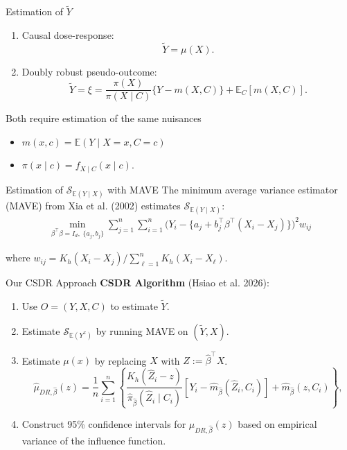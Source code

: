 \documentclass[
  ignorenonframetext,
  aspectratio=169,
  11pt]{beamer}
\providecommand{\tightlist}{%
  \setlength{\itemsep}{0pt}\setlength{\parskip}{0pt}}
\begin{document}
\begin{frame}{Estimation of \(\widetilde{Y}\)}
\protect{}\label{estimation-of-widetildey}
\begin{enumerate}
\tightlist
\item
  Causal dose-response: \[\widetilde{Y}=\mu(X).\]
\item
  Doubly robust pseudo-outcome: \[
  \widetilde{Y}=\xi=
  \frac{\pi(X)}{\pi(X\mid C)}
  \{Y-m(X,C)\}
  +\mathbb{E}_C[m(X,C)].
  \]
\end{enumerate}

Both require estimation of the same nuisances

\begin{itemize}
\tightlist
\item
  \(m(x,c)=\mathbb{E}(Y\mid X=x,C=c)\)
\item
  \(\pi(x\mid c)=f_{X\mid C}(x\mid c)\).
\end{itemize}
\end{frame}

\begin{frame}{Estimation of \(\mathcal{S}_{\mathbb{E}(Y\mid X)}\) with
MAVE}
\protect{}\label{estimation-of-mathcals_mathbbeymid-x-with-mave}
The minimum average variance estimator (MAVE) from {\color{emoryblue}Xia
et al. (2002)} estimates \(\mathcal{S}_{\mathbb{E}(Y\mid X)}\):
\begin{align*}
  \min_{\beta^\top\beta = I_d,\; \{a_j,{b}_j\}}
  \sum_{j=1}^n \sum_{i=1}^n 
  \Big(Y_i - \{a_j +   {b}_j^\top \beta^\top ({X}_i - {X}_j)\}\Big)^2 w_{ij}
\end{align*}

where \(w_{ij} = K_h(X_i-X_j) / \sum^n_{\ell=1} K_h(X_i - X_\ell)\).
\end{frame}

\begin{frame}{Our CSDR Approach}
\protect{}\label{our-csdr-approach}
\textbf{CSDR Algorithm} {\color{emoryblue}(Hsiao et al. 2026)}:

\begin{enumerate}
\tightlist
\item
  Use \(O=(Y,X,C)\) to estimate \(\widetilde{Y}\).
\item
  Estimate \(\mathcal{S}_{\mathbb{E}(Y^x)}\) by running MAVE on
  \((\widetilde{Y}, X)\).
\item
  Estimate \(\mu(x)\) by replacing \(X\) with \(Z:=\hat{\beta}^\top X\).
  \[
  \widehat{\mu}_{DR,\widehat{\beta}}(z)
  =
  \frac{1}{n}\sum_{i=1}^n
  \left\{
  \frac{K_h(\widehat Z_i-z)}
  {\widehat{\pi}_{\widehat{\beta}}(\widehat Z_i\mid C_i)}
  \left[Y_i-\widehat m_{\widehat{\beta}}(\widehat Z_i,C_i)\right]
  +\widehat m_{\widehat{\beta}}(z,C_i)
  \right\},
  \]
\item
  Construct 95\% confidence intervals for
  \(\hat{\mu}_{DR, \hat{\beta}}(z)\) based on empirical variance of the
  influence function.
\end{enumerate}
\end{frame}
\end{document}
